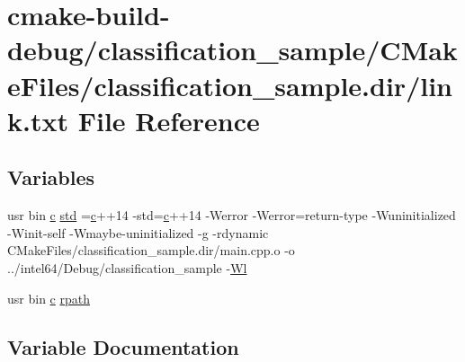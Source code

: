 \hypertarget{classification__sample_2CMakeFiles_2classification__sample_8dir_2link_8txt}{}\section{cmake-\/build-\/debug/classification\+\_\+sample/\+C\+Make\+Files/classification\+\_\+sample.dir/link.txt File Reference}
\label{classification__sample_2CMakeFiles_2classification__sample_8dir_2link_8txt}
\subsection*{Variables}
\begin{DoxyCompactItemize}
\item 
usr bin \hyperlink{CMakeCache_8txt_aac1d6a1710812201527c735f7c6afbaa}{c} \hyperlink{classification__sample_2CMakeFiles_2classification__sample_8dir_2link_8txt_a1ccfea5f558575a112db71eeb271fabf}{std} =\hyperlink{CMakeCache_8txt_aac1d6a1710812201527c735f7c6afbaa}{c}++14 -\/std=\hyperlink{CMakeCache_8txt_aac1d6a1710812201527c735f7c6afbaa}{c}++14 -\/Werror -\/Werror=return-\/type -\/Wuninitialized -\/Winit-\/self -\/Wmaybe-\/uninitialized -\/g -\/rdynamic C\+Make\+Files/classification\+\_\+sample.\+dir/main.\+cpp.\+o -\/o ../intel64/Debug/classification\+\_\+sample -\/\hyperlink{thirdparty_2extension_2CMakeFiles_2cpu__extension_8dir_2link_8txt_af9ccbf658ed2deb89d0d79f211e5b033}{Wl}
\item 
usr bin \hyperlink{CMakeCache_8txt_aac1d6a1710812201527c735f7c6afbaa}{c} \hyperlink{classification__sample_2CMakeFiles_2classification__sample_8dir_2link_8txt_ab9d7fd7120fafa2118a4e08c1df697c7}{rpath}
\end{DoxyCompactItemize}


\subsection{Variable Documentation}
